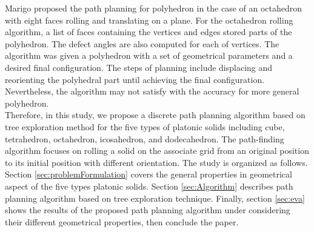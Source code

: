 \noindent Marigo \cite{Marigo00_PlanningMotion_Polyhedra_Rolling} proposed the path planning for polyhedron in the case of an octahedron with eight faces rolling and translating on a plane. For the octahedron rolling algorithm, a list of faces containing the vertices and edges stored parts of the polyhedron. The defect angles are also computed for each of vertices. The algorithm was given a polyhedron with a set of geometrical parameters and a desired final configuration. The steps of planning include displacing and reorienting the polyhedral part until achieving the final configuration. Nevertheless, the algorithm may not satisfy with the accuracy for more general polyhedron.\\

\noindent Therefore, in this study, we propose a discrete path planning algorithm based on tree exploration method for the five types of platonic solids including cube, tetrahedron, octahedron, icosahedron, and dodecahedron. The path-finding algorithm focuses on rolling a solid on the associate grid from an original position to its initial position with different orientation. 
%
The study is organized as follows. Section \ref{sec:problemFormulation} covers the general properties in geometrical aspect of the five types platonic solids. Section \ref{sec:Algorithm} describes path planning algorithm based on tree exploration technique. Finally, section \ref{sec:eva} shows the results of the proposed path planning algorithm under considering their different geometrical properties, then conclude the paper.

